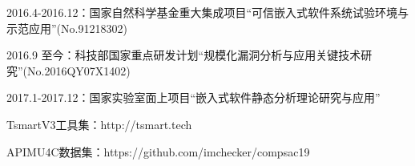 \begin{resume}
  \begin{achievements}
  	\item 2016.4-2016.12：国家自然科学基金重大集成项目“可信嵌入式软件系统试验环境与示范应用”(No.91218302)
  	\item 2016.9 至今：科技部国家重点研发计划“规模化漏洞分析与应用关键技术研究”(No.2016QY07X1402)
  	\item 2017.1-2017.12：国家实验室面上项目“嵌入式软件静态分析理论研究与应用”
  	
  \end{achievements}

  \begin{achievements}
    \item TsmartV3工具集：http://tsmart.tech
    \item APIMU4C数据集：https://github.com/imchecker/compsac19
  \end{achievements}

\end{resume}
